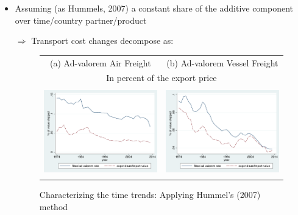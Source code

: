\documentclass[10 pt,Helvetica, french]{beamer}
\begin{document}
\begin{frame}
\begin{itemize}
\item Assuming (as Hummels, 2007) a constant share of the additive component over time/country partner/product \vspace{0.1cm}
\item[$\Rightarrow$] Transport cost changes decompose as:

\begin{figure}[htbp]
\caption{Characterizing the time trends: Applying Hummel's (2007) method }
\label{fig:comp_effects_as_in_Hummels}
\begin{center}
\begin{tabular}{cc}
{\small (a) Ad-valorem Air Freight} & {\small (b) Ad-valorem Vessel Freight}\\
\multicolumn{2}{c}{{\small In percent of the export price}} \\
\includegraphics[width=2in, height=1.5in]{figure5_comme_hummels.pdf}
& \includegraphics[width=2in, height=1.5in]{figure6_comme_hummels.pdf} \\
\end{tabular}
\end{center}
\end{figure}
\end{itemize}
\end{frame}
\end{document}

